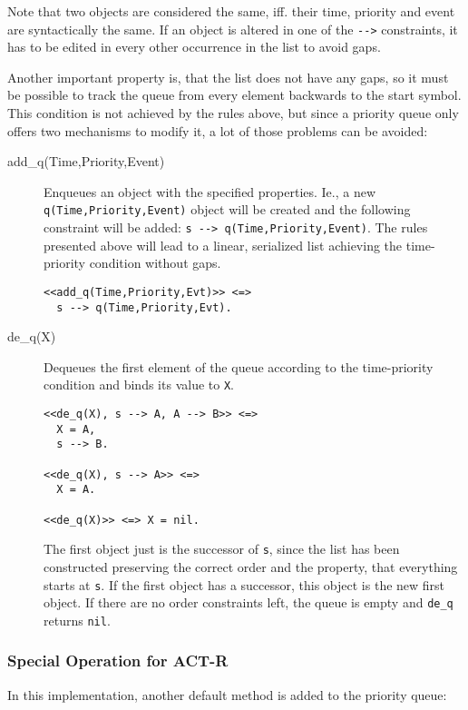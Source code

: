 Note that two objects are considered the same, iff. their time, priority and event are syntactically the same. If an object is altered in one of the \verb|-->| constraints, it has to be edited in every other occurrence in the   list to avoid gaps.

Another important property is, that the list does not have any gaps, so it must be possible to track the queue from every element backwards to the start symbol. This condition is not achieved by the rules above, but since a priority queue only offers two mechanisms to modify it, a lot of those problems can be avoided:

\begin{description}
 \item[add\_q(Time,Priority,Event)] Enqueues an object with the specified properties. Ie., a new \verb|q(Time,Priority,Event)| object will be created and the following constraint will be added: \verb|s --> q(Time,Priority,Event)|. The rules presented above will lead to a linear, serialized list achieving the time-priority condition without gaps.
\begin{lstlisting}
<<add_q(Time,Priority,Evt)>> <=>
  s --> q(Time,Priority,Evt).
\end{lstlisting}
 \item[de\_q(X)] Dequeues the first element of the queue according to the time-priority condition and binds its value to \verb|X|.
\begin{lstlisting}
<<de_q(X), s --> A, A --> B>> <=>
  X = A,
  s --> B.

<<de_q(X), s --> A>> <=>
  X = A.  
  
<<de_q(X)>> <=> X = nil.
\end{lstlisting}

The first object just is the successor of \verb|s|, since the list has been constructed preserving the correct order and the property, that everything starts at \verb|s|. If the first object has a successor, this object is the new first object. If there are no order constraints left, the queue is empty and \verb|de_q| returns \verb|nil|.

\end{description}

\subsubsection{Special Operation for ACT-R}

In this implementation, another default method is added to the priority queue: 

